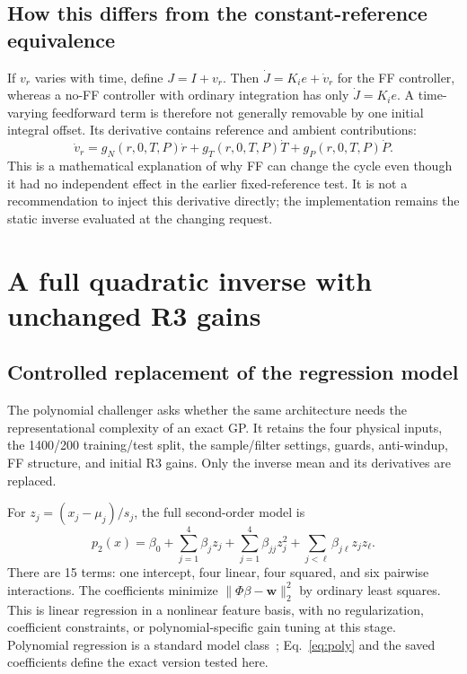 
\section{How this differs from the constant-reference equivalence}
If $v_r$ varies with time, define $J=I+v_r$. Then $\dot J=K_ie+\dot v_r$ for the FF controller, whereas a no-FF controller with ordinary integration has only $\dot J=K_ie$. A time-varying feedforward term is therefore not generally removable by one initial integral offset. Its derivative contains reference and ambient contributions:
\begin{equation}
\dot v_r=g_N(r,0,T,P)\dot r+g_T(r,0,T,P)\dot T+g_P(r,0,T,P)\dot P.
\end{equation}
This is a mathematical explanation of why FF can change the cycle even though it had no independent effect in the earlier fixed-reference test. It is not a recommendation to inject this derivative directly; the implementation remains the static inverse evaluated at the changing request.


\chapter{A full quadratic inverse with unchanged R3 gains}
\section{Controlled replacement of the regression model}
The polynomial challenger asks whether the same architecture needs the representational complexity of an exact GP. It retains the four physical inputs, the 1400/200 training/test split, the sample/filter settings, guards, anti-windup, FF structure, and initial R3 gains. Only the inverse mean and its derivatives are replaced.

For $z_j=(x_j-\mu_j)/s_j$, the full second-order model is
\begin{equation}
p_2(x)=\beta_0+\sum_{j=1}^4\beta_jz_j+
\sum_{j=1}^4\beta_{jj}z_j^2+
\sum_{j<\ell}\beta_{j\ell}z_jz_\ell.
\label{eq:poly}
\end{equation}
There are 15 terms: one intercept, four linear, four squared, and six pairwise interactions. The coefficients minimize $\|\Phi\beta-\bm w\|_2^2$ by ordinary least squares. This is linear regression in a nonlinear feature basis, with no regularization, coefficient constraints, or polynomial-specific gain tuning at this stage. Polynomial regression is a standard model class~\cite{isl}; Eq.~\eqref{eq:poly} and the saved coefficients define the exact version tested here.

